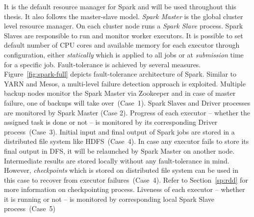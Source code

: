 \begin{description}[leftmargin=0pt]
    \item [Spark Standalone] It is the default resource manager for Spark and will be used throughout this thesis. It also follows the master-slave model. \emph{Spark Master} is the global cluster level resource manager. On each cluster node runs a \emph{Spark Slave} process. Spark Slaves are responsible to run and monitor worker executors. It is possible to set default number of CPU cores and available memory for each executor through configuration, either \emph{statically} which is applied to all jobs or at \emph{submission} time for a specific job. Fault-tolerance is achieved by several measures. Figure~\ref{fig:spark-full} depicts fault-tolerance architecture of Spark. Similar to YARN and Mesos, a multi-level failure detection approach is exploited. Multiple backup nodes monitor the Spark Master via Zookeeper and in case of master failure, one of backups will take over~(Case~1). Spark Slaves and Driver processes are monitored by Spark Master (Case 2). Progress of each executor -- whether the assigned task is done or not -- is monitored by its corresponding Driver process~(Case~3). Initial input and final output of Spark jobs are stored in a distributed file system like HDFS~(Case~4). In case any executor fails to store its final output in DFS, it will be relaunched by Spark Master on another node. Intermediate results are stored locally without any fault-tolerance in mind. However, \emph{checkpoints} which is stored on distributed file system can be used in this case to recover from executor failures~(Case~4). Refer to Section~\ref{sp:rdd} for more information on checkpointing process. Liveness of each executor -- whether it is running or not -- is monitored by corresponding local Spark Slave process~(Case~5)
    \begin{figure}[H]
        \centering

\end{figure}
\end{description}
